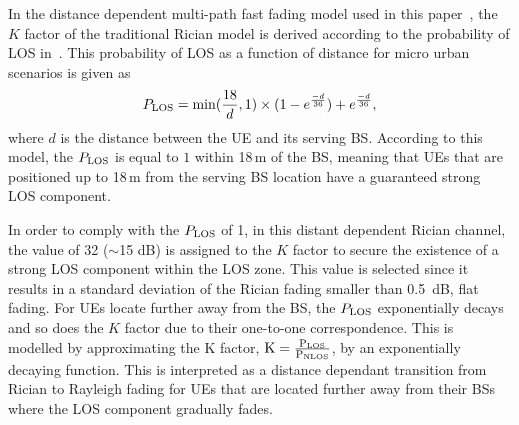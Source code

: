 \documentclass{IEEEtran}
\begin{document}
In the distance dependent multi-path fast fading model used in this paper~\cite{2015Jafari},
the $K$ factor of the traditional Rician model is derived according to the probability of \ac{LOS} in~\cite{TR36.814}.
This probability of \ac{LOS} as a function of distance for micro urban scenarios is given as
\begin{equation}
	\vspace{-0.5mm}
	P_{\rm LOS}= \min(\frac{18}{d},1) \times (1-e^{\frac{-d}{36}}) + e^{\frac{-d}{36}},
	\label{eq:plos}
\end{equation}
where $d$ is the distance between the \ac{UE} and its serving \ac{BS}.
According to this model,
the $P_{\rm LOS}$ is equal to $1$ within 18\,m of the \ac{BS},
meaning that \acp{UE} that are positioned up to 18\,m from the serving \ac{BS} location have a guaranteed strong \ac{LOS} component.

In order to comply with the $P_{\rm LOS}$ of 1,
in this distant dependent Rician channel,
the value of 32 ($\sim$15 dB) is assigned to the $K$ factor to secure the existence of a strong \ac{LOS} component within the \ac{LOS} zone.
This value is selected since it results  in a standard deviation of the Rician fading  smaller than 0.5~dB, flat fading.
For \acp{UE} locate further away from the \ac{BS},
the $P_{\rm LOS}$ exponentially decays and so does the $K$ factor due to their one-to-one correspondence.
This is modelled by approximating the K factor,
$\rm K = \frac{\rm P_{\rm LOS}}{\rm P_{\rm NLOS}}$,
by an exponentially decaying function.
This is interpreted as a distance dependant transition from Rician to Rayleigh fading for \acp{UE} that are located further away from their \acp{BS}
where the \ac{LOS} component gradually fades.
\end{document}
